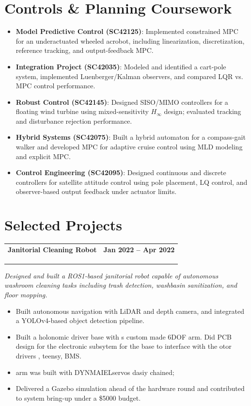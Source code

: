 \documentclass[a4paper,20pt]{article}
\makeatletter
\newcommand{\resumeItem}[2]{
  \item\small{
    \textbf{#1}{: #2 \vspace{-2pt}}
  }
}
\newcommand{\resumeSubheading}[4]{
  \vspace{-1pt}\item
    \begin{tabular*}{0.97\textwidth}{l@{\extracolsep{\fill}}r}
      \textbf{#1} \small \textit{#4} & #2 \\
      \textit{#3} &  \\
    \end{tabular*}\vspace{-5pt}
}
\newcommand{\resumeSubheading}[5]{ %
  \vspace{-1pt}\item
    \begin{tabular*}{0.97\textwidth}{l@{\extracolsep{\fill}}r}
      \textbf{#1} & #2 \\
      \textit{#3} & \textit{#4} \\
    \end{tabular*} 
    \vspace{-2pt}
    \small #5 %
    \vspace{-5pt}
}
\newcommand{\resumeSubItem}[2]{\resumeItem{#1}{#2}\vspace{-3pt}}
\newcommand{\resumeSubHeadingListStart}{\begin{itemize}[leftmargin=*]}
\newcommand{\resumeSubHeadingListEnd}{\end{itemize}}
\makeatother
\begin{document}
\section{Controls \& Planning Coursework \href{https://drive.google.com/drive/folders/1AdLS-fYak-uYYj4obE4DexavJcrpGZJA?usp=sharing}{\faExternalLink}}
\resumeSubHeadingListStart
  \resumeSubItem{Model Predictive Control (SC42125)}{Implemented constrained MPC for an underactuated wheeled acrobot, including linearization, discretization, reference tracking, and output-feedback MPC.}
  \resumeSubItem{Integration Project (SC42035)}{Modeled and identified a cart-pole system, implemented Luenberger/Kalman observers, and compared LQR vs. MPC control performance.}
  \resumeSubItem{Robust Control (SC42145)}{Designed SISO/MIMO controllers for a floating wind turbine using mixed-sensitivity $H_\infty$ design; evaluated tracking and disturbance rejection performance.}
  \resumeSubItem{Hybrid Systems (SC42075)}{Built a hybrid automaton for a compass-gait walker and developed MPC for adaptive cruise control using MLD modeling and explicit MPC.}
  \resumeSubItem{Control Engineering (SC42095)}{Designed continuous and discrete controllers for satellite attitude control using pole placement, LQ control, and observer-based output feedback under actuator limits.}
\resumeSubHeadingListEnd

\vspace{-5pt}
\section{Selected Projects}

\resumeSubheading
  {Janitorial Cleaning Robot \href{https://github.com/NickNair/artpark_robotics_challenge}{\faExternalLink} \href{https://www.youtube.com/watch?v=HfuiV0cgzNs}{\faExternalLink}}{\textbf{Jan 2022 – Apr 2022}}
  {ARTPARK Robotics Challenge, IISc Bangalore \\ \\}{}
  \textit{Designed and built a ROS1-based janitorial robot capable of autonomous washroom cleaning tasks including trash detection, washbasin sanitization, and floor mopping.}
  \begin{itemize}
    \item Built autonomous navigation with LiDAR and depth camera, and integrated a YOLOv4-based object detection pipeline.\vspace{-2pt}
    \item Built a holonomic driver base with s custom made 6DOF arm. Did PCB design for the electronic subsytem for the base to interface with the otor drivers , teensy, BMS.
    \item arm was built with DYNMAIELservos dasiy chained; 
    \item Delivered a Gazebo simulation ahead of the hardware round and contributed to system bring-up under a \$5000 budget.
  \end{itemize}
  
\end{document}
